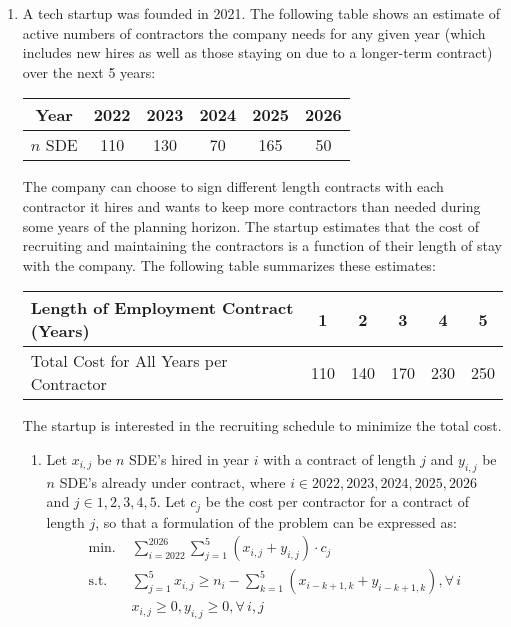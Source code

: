 \documentclass{article}
\begin{document}
\begin{enumerate}
    \item A tech startup was founded in 2021. The following table shows an estimate of active numbers of contractors the company needs for any given year (which includes new hires as well as those staying on due to a longer-term contract) over the next 5 years:

    \begin{center}
        \begin{tabular}{c|c c c c c}
        Year & 2022 & 2023 & 2024 & 2025 & 2026 \\
        \hline
        $n$ SDE & 110 & 130 & 70 & 165 & 50
        \end{tabular}
    \end{center}

    The company can choose to sign different length contracts with each contractor it hires and wants to keep more contractors than needed during some years of the planning horizon. The startup estimates that the cost of recruiting and maintaining the contractors is a function of their length of stay with the company. The following table summarizes these estimates:
    
    \begin{center}
        \begin{tabular}{l|c c c c c}
        Length of Employment Contract (Years) & 1 & 2 & 3 & 4 & 5 \\
        \hline
        Total Cost for All Years per Contractor & 110 & 140 & 170 & 230 & 250
        \end{tabular}
    \end{center}

    The startup is interested in the recruiting schedule to minimize the total cost.

    \begin{enumerate}
        \item Let $x_{i,j}$ be $n$ SDE's hired in year $i$ with a contract of length $j$ and $y_{i,j}$ be $n$ SDE's already under contract, where $i\in{2022,2023,2024,2025,2026}$ and $j\in{1,2,3,4,5}$. Let $c_j$ be the cost per contractor for a contract of length $j$, so that a formulation of the problem can be expressed as:
\begin{equation}\nonumber
\begin{split}
\text{min. } & \sum_{i=2022}^{2026} \sum_{j=1}^{5} (x_{i,j} + y_{i,j}) \cdot c_j \\
\text{s.t. }
& \sum_{j=1}^{5} x_{i,j} \geq n_{i} - \sum_{k=1}^{5} (x_{i-k+1,k} + y_{i-k+1,k}), \forall \, i \\
& x_{i,j} \geq 0, y_{i,j} \geq 0, \forall \, i,j
\end{split}
\end{equation}


\end{enumerate}
\end{enumerate}
\end{document}
